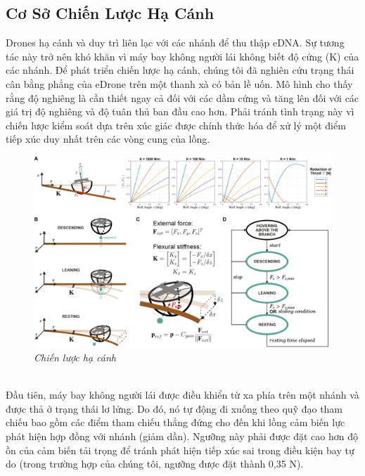 \documentclass[12pt,a4paper]{article}
\begin{document}
\subsection{Cơ Sở Chiến Lược Hạ Cánh}
Drones hạ cánh và duy trì liên lạc với các nhánh để thu thập eDNA. Sự tương tác này trở nên khó khăn vì máy bay không người lái không biết độ cứng (K) của các nhánh. Để phát triển chiến lược hạ cánh, chúng tôi đã nghiên cứu trạng thái cân bằng phẳng của eDrone trên một thanh xà có bản lề uốn. Mô hình cho thấy rằng độ nghiêng là cần thiết ngay cả đối với các dầm cứng và tăng lên đối với các giá trị độ nghiêng và độ tuân thủ ban đầu cao hơn. Phải tránh tình trạng này vì chiến lược kiểm soát dựa trên xúc giác được chính thức hóa để xử lý một điểm tiếp xúc duy nhất trên các vòng cung của lồng.\\
\begin{figure}[ht!]
    \centering
    \includegraphics[scale = 0.7]{hinh 3}
    \caption{\textit{Chiến lược hạ cánh}}
    \label{fig3}
\end{figure} \\
Đầu tiên, máy bay không người lái được điều khiển từ xa phía trên một nhánh và được thả ở trạng thái lơ lửng. Do đó, nó tự động đi xuống theo quỹ đạo tham chiếu bao gồm các điểm tham chiếu thẳng đứng cho đến khi lồng cảm biến lực phát hiện hợp đồng với nhánh (giảm dần). Ngưỡng này phải được đặt cao hơn độ ồn của cảm biến tải trọng để tránh phát hiện tiếp xúc sai trong điều kiện bay tự do (trong trường hợp của chúng tôi, ngưỡng được đặt thành 0,35 N).\\
\\
\end{document}
